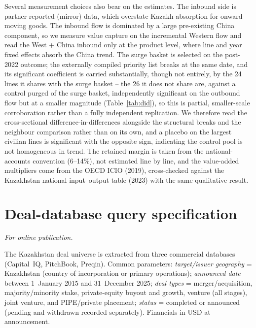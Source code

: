 \documentclass[12pt]{article}
\begin{document}
Several measurement choices also bear on the estimates. The inbound side is partner-reported
(mirror) data, which overstate Kazakh absorption for onward-moving goods. The inbound flow is
dominated by a large pre-existing China component, so we measure value capture on the
incremental Western flow and read the West + China inbound only at the product level, where
line and year fixed effects absorb the China trend. The surge basket is selected on the
post-2022 outcome; the externally compiled priority list breaks at the same date, and its
significant coefficient is carried substantially, though not entirely, by the 24 lines it
shares with the surge basket -- the 26 it does not share are, against a control purged of the
surge basket, independently significant on the outbound flow but at a smaller magnitude
(Table~\ref{tab:did}), so this is partial, smaller-scale corroboration
rather than a fully independent replication. We
therefore read the cross-sectional difference-in-differences alongside the structural breaks
and the neighbour comparison rather than on its own, and a placebo on the largest civilian lines
is significant with the opposite sign, indicating the control pool is not homogeneous in
trend. The retained margin is taken from the national-accounts convention (6--14\%), not
estimated line by line, and the value-added multipliers come from the OECD ICIO (2019),
cross-checked against the Kazakhstan national input--output table (2023) with the same
qualitative result.

\appendix
\renewcommand{\thesection}{\Alph{section}}

\section{Deal-database query specification}\label{app:deals}
\emph{For online publication.}

\medskip
The Kazakhstan deal universe is extracted from three commercial databases (Capital~IQ,
PitchBook, Preqin). Common parameters: \emph{target/issuer geography} = Kazakhstan (country of
incorporation or primary
operations); \emph{announced date} between 1~January 2015 and 31~December 2025; \emph{deal
types} = merger/acquisition, majority/minority stake, private-equity buyout and growth,
venture (all stages), joint venture, and PIPE/private placement; \emph{status} = completed or
announced (pending and withdrawn recorded separately). Financials in USD at announcement.
\end{document}

